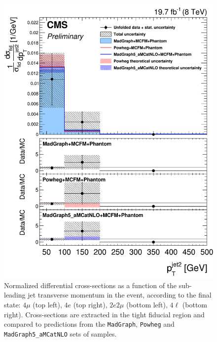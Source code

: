 \begin{figure}[hbtp]
\begin{center}
    \includegraphics[width=\cmsFigWidth]{Figures/DiffCrossSecZZTo4lPtJet2_Unfolded_fr_MadGraph_norm.png}       
    \caption{\footnotesize{Normalized differential cross-sections as a function of the sub-leading jet transverse momentum in the event, according to the final state: $4\mu$ (top left), $4e$ (top right), $2e2\mu$  (bottom left),  $4\ell$ (bottom right). Cross-sections are extracted in the tight fiducial region and compared to predictions from the \texttt{MadGraph}, \texttt{Powheg}  and \texttt{MadGraph5\_aMCatNLO} sets of samples.}}
    \label{fig:diff_xs_ptjet2}
  \end{center}
\end{figure}
